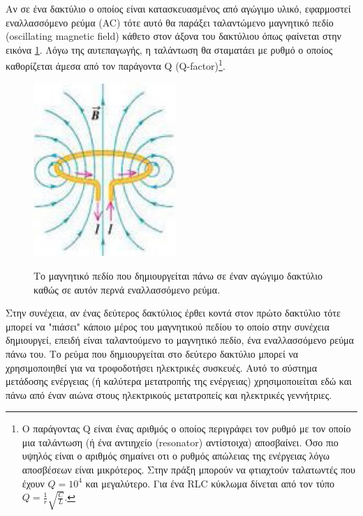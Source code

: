 Αν σε ένα δακτύλιο ο οποίος είναι κατασκευασμένος από αγώγιμο υλικό, εφαρμοστεί εναλλασσόμενο ρεύμα (AC) τότε αυτό θα παράξει ταλαντώμενο μαγνητικό πεδίο (oscillating
magnetic field) κάθετο στον άξονα του δακτύλιου όπως φαίνεται στην εικόνα \ref{fig:magnetic_field}. Λόγω της αυτεπαγωγής, η ταλάντωση θα σταματάει με ρυθμό ο
οποίος καθορίζεται άμεσα από τον παράγοντα Q (Q-factor)\footnote{Ο παράγοντας Q είναι ένας αριθμός ο οποίος περιγράφει τον ρυθμό με τον οποίο μια ταλάντωση (ή ένα
αντιηχείο (resonator) αντίστοιχα) αποσβαίνει. Όσο πιο υψηλός είναι ο αριθμός σημαίνει οτι ο ρυθμός απώλειας της ενέργειας λόγω αποσβέσεων είναι μικρότερος. Στην
πράξη μπορούν να φτιαχτούν ταλατωντές που έχουν $Q=10^{4}$ και μεγαλύτερο. Για ένα RLC κύκλωμα δίνεται από τον τύπο $Q=\frac{1}{r}\sqrt{\frac{C}{L}}$.}.
\begin{figure}
  \vspace{-20pt}
  \begin{center}
  \includegraphics[width=0.48\textwidth]{images/inductive_ring.jpg}\label{fig:magnetic_field}
  \end{center}
  \vspace{-20pt}
  \caption{Το μαγνητικό πεδίο που δημιουργείται πάνω σε έναν αγώγιμο δακτύλιο καθώς σε αυτόν περνά εναλλασσόμενο ρεύμα.}
  \vspace{-10pt}
\end{figure}
Στην συνέχεια, αν ένας δεύτερος δακτύλιος έρθει κοντά στον πρώτο δακτύλιο τότε μπορεί να "πιάσει" κάποιο μέρος του μαγνητικού πεδίου το οποίο στην συνέχεια
δημιουργεί, επειδή είναι ταλαντούμενο το μαγνητικό πεδίο, ένα εναλλασσόμενο ρεύμα πάνω του. Το ρεύμα που δημιουργείται στο δεύτερο δακτύλιο μπορεί να χρησιμοποιηθεί
για να τροφοδοτήσει ηλεκτρικές συσκευές.  Αυτό το σύστημα μετάδοσης ενέργειας (ή καλύτερα μετατροπής της ενέργειας) χρησιμοποιείται εδώ και πάνω από έναν αιώνα στους
ηλεκτρικούς μετατροπείς και ηλεκτρικές γεννήτριες.

